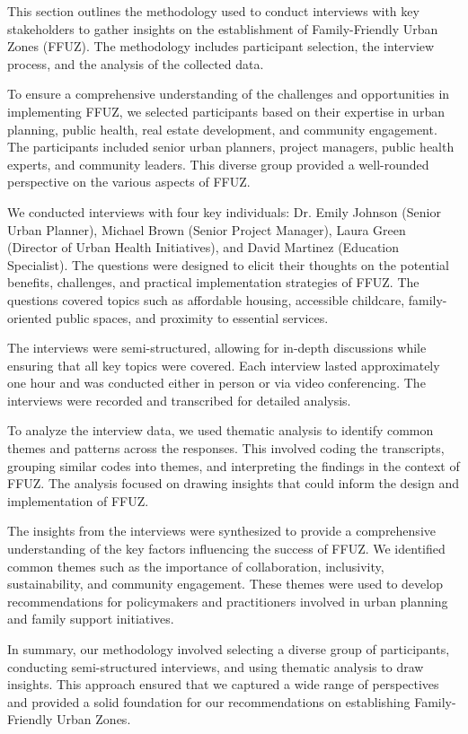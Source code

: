 \documentclass{article} %
\begin{document}
This section outlines the methodology used to conduct interviews with key stakeholders to gather insights on the establishment of Family-Friendly Urban Zones (FFUZ). The methodology includes participant selection, the interview process, and the analysis of the collected data.

To ensure a comprehensive understanding of the challenges and opportunities in implementing FFUZ, we selected participants based on their expertise in urban planning, public health, real estate development, and community engagement. The participants included senior urban planners, project managers, public health experts, and community leaders. This diverse group provided a well-rounded perspective on the various aspects of FFUZ.

We conducted interviews with four key individuals: Dr. Emily Johnson (Senior Urban Planner), Michael Brown (Senior Project Manager), Laura Green (Director of Urban Health Initiatives), and David Martinez (Education Specialist). The questions were designed to elicit their thoughts on the potential benefits, challenges, and practical implementation strategies of FFUZ. The questions covered topics such as affordable housing, accessible childcare, family-oriented public spaces, and proximity to essential services.

The interviews were semi-structured, allowing for in-depth discussions while ensuring that all key topics were covered. Each interview lasted approximately one hour and was conducted either in person or via video conferencing. The interviews were recorded and transcribed for detailed analysis.

To analyze the interview data, we used thematic analysis to identify common themes and patterns across the responses. This involved coding the transcripts, grouping similar codes into themes, and interpreting the findings in the context of FFUZ. The analysis focused on drawing insights that could inform the design and implementation of FFUZ.

The insights from the interviews were synthesized to provide a comprehensive understanding of the key factors influencing the success of FFUZ. We identified common themes such as the importance of collaboration, inclusivity, sustainability, and community engagement. These themes were used to develop recommendations for policymakers and practitioners involved in urban planning and family support initiatives.

In summary, our methodology involved selecting a diverse group of participants, conducting semi-structured interviews, and using thematic analysis to draw insights. This approach ensured that we captured a wide range of perspectives and provided a solid foundation for our recommendations on establishing Family-Friendly Urban Zones.
\end{document}
